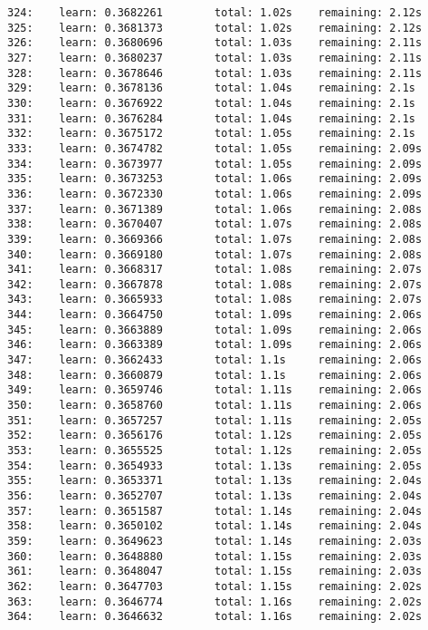 \documentclass[11pt]{article}
\begin{document}
\begin{Verbatim}[commandchars=\\\{\}]
324:    learn: 0.3682261        total: 1.02s    remaining: 2.12s
325:    learn: 0.3681373        total: 1.02s    remaining: 2.12s
326:    learn: 0.3680696        total: 1.03s    remaining: 2.11s
327:    learn: 0.3680237        total: 1.03s    remaining: 2.11s
328:    learn: 0.3678646        total: 1.03s    remaining: 2.11s
329:    learn: 0.3678136        total: 1.04s    remaining: 2.1s
330:    learn: 0.3676922        total: 1.04s    remaining: 2.1s
331:    learn: 0.3676284        total: 1.04s    remaining: 2.1s
332:    learn: 0.3675172        total: 1.05s    remaining: 2.1s
333:    learn: 0.3674782        total: 1.05s    remaining: 2.09s
334:    learn: 0.3673977        total: 1.05s    remaining: 2.09s
335:    learn: 0.3673253        total: 1.06s    remaining: 2.09s
336:    learn: 0.3672330        total: 1.06s    remaining: 2.09s
337:    learn: 0.3671389        total: 1.06s    remaining: 2.08s
338:    learn: 0.3670407        total: 1.07s    remaining: 2.08s
339:    learn: 0.3669366        total: 1.07s    remaining: 2.08s
340:    learn: 0.3669180        total: 1.07s    remaining: 2.08s
341:    learn: 0.3668317        total: 1.08s    remaining: 2.07s
342:    learn: 0.3667878        total: 1.08s    remaining: 2.07s
343:    learn: 0.3665933        total: 1.08s    remaining: 2.07s
344:    learn: 0.3664750        total: 1.09s    remaining: 2.06s
345:    learn: 0.3663889        total: 1.09s    remaining: 2.06s
346:    learn: 0.3663389        total: 1.09s    remaining: 2.06s
347:    learn: 0.3662433        total: 1.1s     remaining: 2.06s
348:    learn: 0.3660879        total: 1.1s     remaining: 2.06s
349:    learn: 0.3659746        total: 1.11s    remaining: 2.06s
350:    learn: 0.3658760        total: 1.11s    remaining: 2.06s
351:    learn: 0.3657257        total: 1.11s    remaining: 2.05s
352:    learn: 0.3656176        total: 1.12s    remaining: 2.05s
353:    learn: 0.3655525        total: 1.12s    remaining: 2.05s
354:    learn: 0.3654933        total: 1.13s    remaining: 2.05s
355:    learn: 0.3653371        total: 1.13s    remaining: 2.04s
356:    learn: 0.3652707        total: 1.13s    remaining: 2.04s
357:    learn: 0.3651587        total: 1.14s    remaining: 2.04s
358:    learn: 0.3650102        total: 1.14s    remaining: 2.04s
359:    learn: 0.3649623        total: 1.14s    remaining: 2.03s
360:    learn: 0.3648880        total: 1.15s    remaining: 2.03s
361:    learn: 0.3648047        total: 1.15s    remaining: 2.03s
362:    learn: 0.3647703        total: 1.15s    remaining: 2.02s
363:    learn: 0.3646774        total: 1.16s    remaining: 2.02s
364:    learn: 0.3646632        total: 1.16s    remaining: 2.02s

\end{Verbatim}
\end{document}
